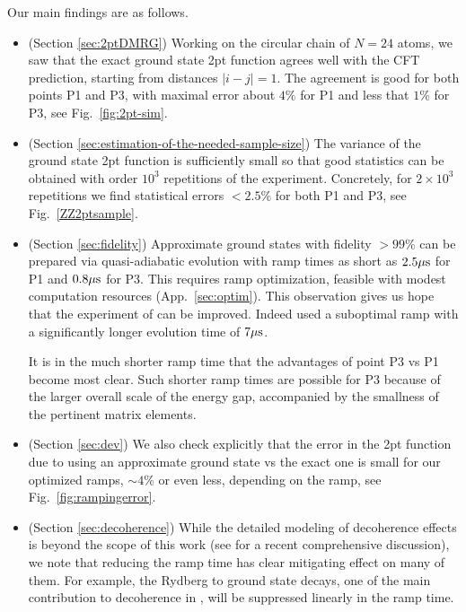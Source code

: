 \documentclass[a4paper,12pt]{article}
\theoremstyle{remark}
\theoremstyle{theorem}
\begin{document}
Our main findings are as follows.
\begin{itemize}
	\item
	(Section \ref{sec:2ptDMRG}) Working on the circular chain of $N=24$ atoms, we saw that the exact ground state 2pt function agrees well with the CFT prediction, starting from distances $|i-j|=1$. The agreement is good for both points P1 and P3, with maximal error about $4\%$ for P1 and less that $1\%$ for P3, see Fig.~\ref{fig:2pt-sim}.
	\item
	(Section \ref{sec:estimation-of-the-needed-sample-size}) The variance of the ground state 2pt function is sufficiently small so that good statistics can be obtained with order $10^3$ repetitions of the experiment. Concretely, for $2\times 10^3$ repetitions we find statistical errors $<2.5\%$ for both P1 and P3, see Fig.~\ref{ZZ2ptsample}.
	\item
	(Section \ref{sec:fidelity}) Approximate ground states with fidelity $>99\%$ can be prepared via quasi-adiabatic evolution with ramp times as short as $2.5\mu{\rm s}$ for P1 and $0.8\mu{\rm s}$ for P3. This requires ramp optimization, feasible with modest computation resources (App.~\ref{sec:optim}). This observation gives us hope that the experiment of \cite{Fang:2024uyf} can be improved. Indeed \cite{Fang:2024uyf} used a suboptimal ramp with a significantly longer evolution time of $7\mu{\rm s}$.
	
	It is in the much shorter ramp time that the advantages of point P3 vs P1 become most clear. Such shorter ramp times are possible for P3 because of the larger overall scale of the energy gap, accompanied by the smallness of the pertinent matrix elements.
	
	\item (Section \ref{sec:dev}) We also check explicitly that the error in the 2pt function due to using an approximate ground state vs the exact one is small for our optimized ramps, $\sim 4\%$ or even less, depending on the ramp, see Fig.~\ref{fig:rampingerror}.
	
	\item (Section \ref{sec:decoherence}) While the detailed modeling of decoherence effects is beyond the scope of this work (see \cite{Dalyac:2026jpu} for a recent comprehensive discussion), we note that reducing the ramp time has clear mitigating effect on many of them. For example, the Rydberg to ground state decays, one of the main contribution to decoherence in \cite{Fang:2024uyf}, will be suppressed linearly in the ramp time. 
\end{itemize}
\end{document}
